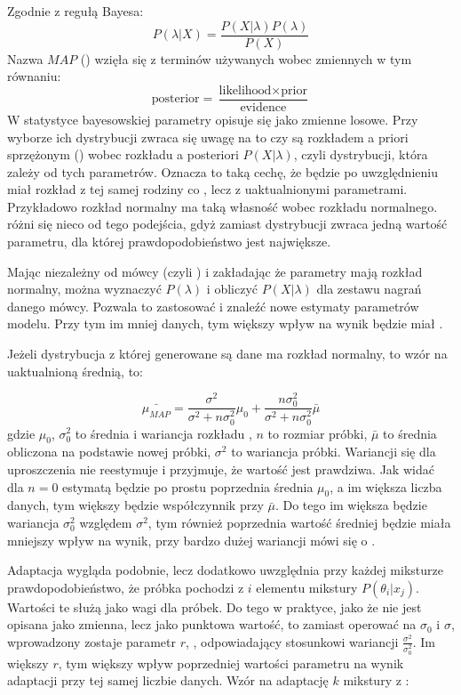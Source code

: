Zgodnie z regułą Bayesa:
$$P(\lambda | X) = \frac{P(X | \lambda) P(\lambda)}{P(X)}$$
Nazwa $MAP$ () wzięła się z terminów używanych wobec zmiennych w tym równaniu:
$$\text{posterior} = \frac{\text{likelihood} \times \text{prior}}{\text{evidence}}$$
W statystyce bayesowskiej parametry opisuje się jako zmienne losowe. Przy wyborze ich dystrybucji zwraca się uwagę
na to czy są rozkładem a priori sprzężonym () wobec rozkładu a posteriori $P(X | \lambda)$,
czyli dystrybucji, która zależy od tych parametrów.
Oznacza to taką cechę, że  będzie po uwzględnieniu  miał rozkład z tej samej
rodziny co , lecz z uaktualnionymi parametrami. Przykładowo rozkład normalny ma taką własność wobec
rozkładu normalnego.   różni się nieco od tego podejścia, gdyż zamiast dystrybucji zwraca jedną
wartość parametru, dla której prawdopodobieństwo jest największe.

Mając  niezależny od mówcy (czyli )
i zakładając że parametry mają rozkład normalny, można wyznaczyć
$P(\lambda)$ i obliczyć $P(X | \lambda)$ dla zestawu nagrań danego mówcy. Pozwala to zastosować
 i znaleźć nowe
estymaty parametrów modelu. Przy tym im mniej danych, tym większy wpływ na wynik będzie miał .

Jeżeli dystrybucja z której generowane są dane ma rozkład normalny, to wzór na uaktualnioną średnią, to:

$$\bar{\mu_{MAP}} = \frac{\sigma^2}{\sigma^2 + n \sigma_0^2} \mu_0 + \frac{n \sigma^2_0}{\sigma^2 + n \sigma_0^2} \bar{\mu}$$
gdzie $\mu_0$, $\sigma_0^2$ to średnia i wariancja rozkładu , $n$ to rozmiar próbki, $\bar{\mu}$ to średnia obliczona na podstawie nowej próbki, $\sigma^2$ to wariancja próbki. Wariancji się dla uproszczenia nie reestymuje
i przyjmuje, że wartość  jest prawdziwa. Jak widać
dla $n = 0$  estymatą będzie po prostu poprzednia średnia $\mu_0$, a im większa liczba danych, tym
większy będzie współczynnik przy $\bar{\mu}$. Do tego im większa będzie wariancja  $\sigma_0^2$ względem
$\sigma^2$, tym również poprzednia wartość średniej będzie miała mniejszy wpływ na wynik, przy bardzo dużej wariancji
mówi się o \cite{fundamentalsOfSpeech}.

Adaptacja  wygląda podobnie, lecz dodatkowo uwzględnia przy każdej miksturze prawdopodobieństwo,
że próbka pochodzi z $i$ elementu mikstury $P(\theta_i | x_j)$. Wartości te służą jako wagi dla próbek. Do tego w
praktyce, jako że  nie jest opisana jako zmienna, lecz jako punktowa wartość, to zamiast
operować na $\sigma_0$ i $\sigma$, wprowadzony zostaje parametr $r$, , odpowiadający
stosunkowi wariancji $\frac{\sigma^2}{\sigma_0^2}$. Im większy $r$, tym większy wpływ poprzedniej wartości
parametru na wynik adaptacji przy tej samej liczbie danych. Wzór na adaptację $k$ mikstury z \cite{comparisonOfMultiple}:

